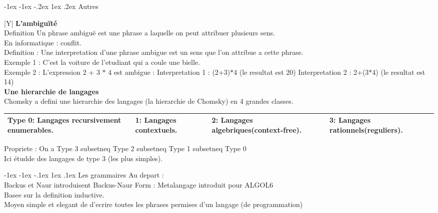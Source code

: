 \documentclass[5pt]{article}
\makeatletter
\renewcommand{\subsubsection}{\@startsection {section}{1}{\z@}%
             {-1ex \@plus -1ex \@minus -.2ex}%
             {1ex \@plus.2ex}%
             {\normalfont\scriptsize\sffamily\bfseries}}
\renewcommand{\subsection}{\@startsection {section}{1}{\z@}%
             {-1ex \@plus -1ex \@minus -.1ex}%
             {1ex \@plus.1ex}%
             {\normalfont\small\sffamily\bfseries}}
\makeatother
\begin{document}
\begin{scriptsize}
\subsubsection{Autres}
\begin{tabularx}{\linewidth}{|Y|}
\hline
\textbf{L’ambiguïté}\\
Definition Un phrase ambiguë est une phrase a laquelle on peut attribuer plusieurs sens.\\
En informatique : conflit.\\
Definition :
Une interpretation d'une phrase ambigue est un sens que l'on attribue a cette phrase.\\
Exemple 1 : C'est la voiture de l'etudiant qui a coule une bielle.\\
Exemple 2 : L'expression 2 + 3 $\ast$ 4 est ambigue : Interpretation 1 : (2+3)$\ast$4 (le resultat est 20) Interpretation 2 : 2+(3$\ast$4) (le resultat est 14)\\\hline
\textbf{Une hierarchie de langages}\\
Chomsky a defini une hierarchie des langages (la hierarchie de Chomsky) en 4 grandes classes.\\
\begin{tabular}{|l|l|l|l|}
\hline
Type 0: Langages recursivement enumerables.&
1: Langages contextuels.&
2: Langages algebriques(context-free).&
3: Langages rationnels(reguliers).
\\ \hline
\end{tabular}
Propriete : On a Type 3 subsetneq Type 2 subsetneq Type 1 subsetneq Type 0\\
Ici étudde des langages de type 3 (les plus simples).\\\hline
\end{tabularx} 
\subsection{Les grammaires}
Au depart :\\
Backus et Naur introduisent Backus-Naur Form : Metalangage introduit pour ALGOL6\\
Basee sur la definition inductive.\\
Moyen simple et elegant de d'ecrire toutes les phrases permises d’un langage (de programmation)\\


\end{scriptsize}
\end{document}

